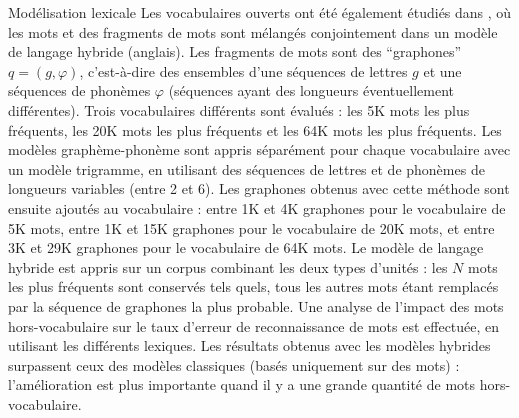 \documentclass{style/these}
\let\oldcite=\cite
\renewcommand{\cite}[1]{{\fontfamily{qcs}\selectfont{\color{darkerblue}[\oldcite{#1}]}}}
\begin{document}
\begin{part}{Modélisation lexicale}
Les vocabulaires ouverts ont été également étudiés dans \cite{Bisani:2005}, où les mots et des fragments de mots sont mélangés conjointement dans un modèle de langage hybride (anglais). 
Les fragments de mots sont des ``graphones'' $q=\left(g,\varphi\right)$, c'est-à-dire des ensembles d'une séquences de lettres $g$ et une séquences de phonèmes $\varphi$ (séquences ayant des longueurs éventuellement différentes). 
Trois vocabulaires différents sont évalués : les 5K mots les plus fréquents, les 20K mots les plus fréquents et les 64K mots les plus fréquents. Les modèles graphème-phonème sont appris séparément pour chaque vocabulaire avec un modèle trigramme, en utilisant des séquences de lettres et de phonèmes de longueurs variables (entre 2 et 6). Les graphones obtenus avec cette méthode sont ensuite ajoutés au vocabulaire : entre 1K et 4K graphones pour le vocabulaire de 5K mots, entre 1K et 15K graphones pour le vocabulaire de 20K mots, et entre 3K et 29K graphones pour le vocabulaire de 64K mots. Le modèle de langage hybride est appris sur un corpus combinant les deux types d'unités :  les $N$ mots les plus fréquents sont conservés tels quels, tous les autres mots étant remplacés par la séquence de graphones la plus probable. 
Une analyse de l'impact des mots hors-vocabulaire sur le taux d'erreur de reconnaissance de mots est effectuée, en utilisant les différents lexiques. Les résultats obtenus avec les modèles hybrides surpassent ceux des modèles classiques (basés uniquement sur des mots) : l'amélioration est plus importante quand il y a une grande quantité de mots hors-vocabulaire. 


\end{part}
\end{document}
